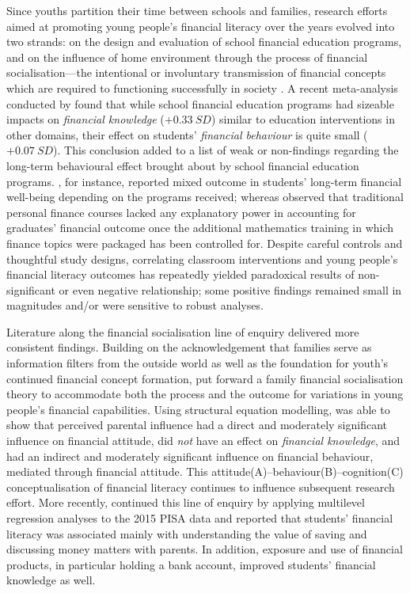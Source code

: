 \documentclass[a4paper,11pt,UKenglish,twoside,openright]{report}\usepackage[]{graphicx}\usepackage[]{color}
\begin{document}
Since youths partition their time between schools and families, research efforts aimed at promoting young people's financial literacy over the years evolved into two strands: on the design and evaluation of school financial education programs, and on the influence of home environment through the process of financial socialisation---the intentional or involuntary transmission of financial concepts which are required to functioning successfully in society \parencite{bowen:2002}. A recent meta-analysis conducted by \textcite{kaiser:2020} found that while school financial education programs had sizeable impacts on \emph{financial knowledge} ($+0.33\ SD$) similar to education interventions in other domains, their effect on students' \emph{financial behaviour} is quite small ($+0.07\ SD$). This conclusion added to a list of weak or non-findings regarding the long-term behavioural effect brought about by school financial education programs. \textcite{brown:2016}, for instance, reported mixed outcome in students' long-term financial well-being depending on the programs received; whereas \textcite{cole:2016} observed that traditional personal finance courses lacked any explanatory power in accounting for graduates' financial outcome once the additional mathematics training in which finance topics were packaged has been controlled for. Despite careful controls and thoughtful study designs, correlating classroom interventions and young people's financial literacy outcomes has repeatedly yielded paradoxical results of non-significant or even negative relationship; some positive findings remained small in magnitudes and/or were sensitive to robust analyses.

Literature along the financial socialisation line of enquiry delivered more consistent findings. Building on the acknowledgement that families serve as information filters from the outside world \parencite{danes:2007} as well as the foundation for youth's continued financial concept formation, \textcite{gudmunson:2011} put forward a family financial socialisation theory to accommodate both the process and the outcome for variations in young people's financial capabilities. Using structural equation modelling, \textcite{jorgensen:2010} was able to show that perceived parental influence had a direct and moderately significant influence on financial attitude, did \emph{not} have an effect on \emph{financial knowledge}, and had an indirect and moderately significant influence on financial behaviour, mediated through financial attitude. This attitude(A)--behaviour(B)--cognition(C) conceptualisation of financial literacy \parencite{potrich:2015b} continues to influence subsequent research effort. More recently, \textcite{morenoherrero:2018a} continued this line of enquiry by applying multilevel regression analyses to the 2015 PISA data and reported that students' financial literacy was associated mainly with understanding the value of saving and discussing money matters with parents. In addition, exposure and use of financial products, in particular holding a bank account, improved students' financial knowledge as well.
\end{document}
